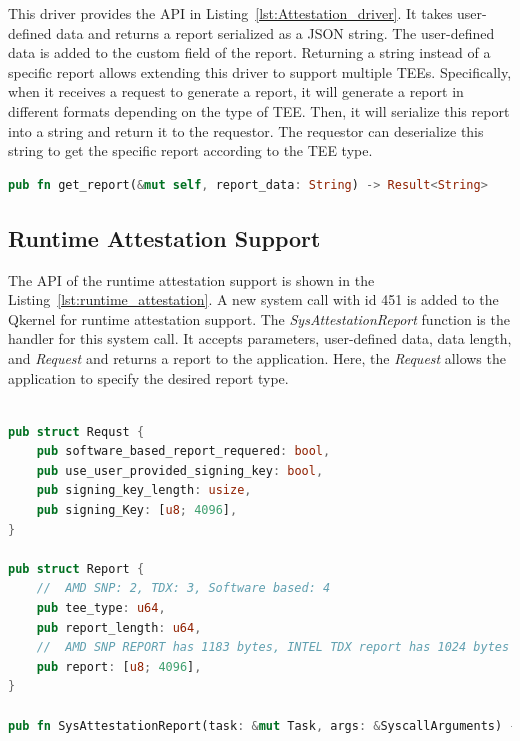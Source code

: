 This driver provides the API in Listing~\ref{lst:Attestation_driver}. It takes user-defined data and returns a report serialized as a JSON string. The user-defined data is added to the custom field of the report. Returning a string instead of a specific report allows extending this driver to 
support multiple \acrshort{TEE}s. Specifically,  when it receives a request to generate a report, it will generate a report in different formats depending on the type of \acrshort{TEE}. Then, it will serialize this report into a string and return it to the requestor. The requestor can deserialize 
this string to get the specific report according to the \acrshort{TEE} type.

\begin{lstlisting}[language=rust, caption= API of attestation driver, label={lst:Attestation_driver}]
pub fn get_report(&mut self, report_data: String) -> Result<String>   
\end{lstlisting}

\subsection{Runtime Attestation Support}
The API of the runtime attestation support is shown in the Listing~\ref{lst:runtime_attestation}. A new system call with id 451 is added to the Qkernel for runtime attestation support. The \emph{SysAttestationReport} function is the handler for this system call. It accepts parameters, 
user-defined data, data length, and \emph{Request} and returns a report to the application. Here, the \emph{Request} allows the application to specify the desired report type.

\begin{lstlisting}[language=rust, caption= Interface for accessing the file type secrets, label={lst:runtime_attestation}]

pub struct Requst {
    pub software_based_report_requered: bool,
    pub use_user_provided_signing_key: bool,
    pub signing_key_length: usize, 
    pub signing_Key: [u8; 4096],  
}

pub struct Report {
    //  AMD SNP: 2, TDX: 3, Software based: 4
    pub tee_type: u64,
    pub report_length: u64,
    //  AMD SNP REPORT has 1183 bytes, INTEL TDX report has 1024 bytes
    pub report: [u8; 4096],  
}

pub fn SysAttestationReport(task: &mut Task, args: &SyscallArguments) -> Result<i64>      
\end{lstlisting}

